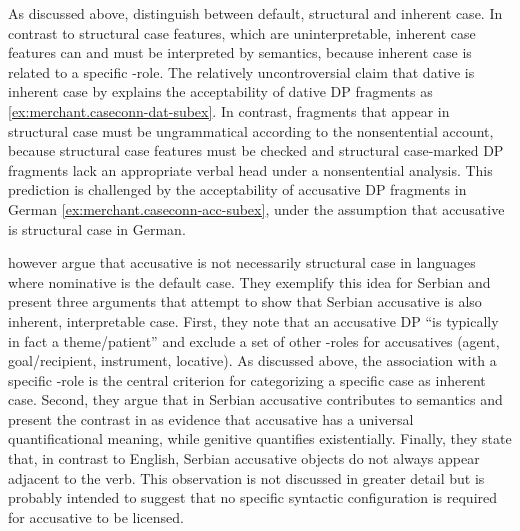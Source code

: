 As discussed above, \citet{progovac.etal2006} distinguish between default, structural and inherent case. In contrast to structural case features, which are uninterpretable, inherent case features can and must be interpreted by semantics, because inherent case is related to a specific \texttheta-role. The relatively uncontroversial claim that dative is inherent case by \citet[339]{progovac.etal2006} explains the acceptability of dative DP fragments as \ref{ex:merchant.caseconn-dat-subex}. In contrast, fragments that appear in structural case must be ungrammatical according to the nonsentential account, because structural case features must be checked and structural case-marked DP fragments lack an appropriate verbal head under a nonsentential analysis. This prediction is challenged by the acceptability of accusative DP fragments in German \ref{ex:merchant.caseconn-acc-subex}, under the assumption that accusative is structural case in German.

\newpage
\noindent \citet{progovac.etal2006} however argue that accusative is not necessarily structural case in languages where nominative is the default case. They exemplify this idea for Serbian and present three arguments that attempt to show that Serbian accusative is also inherent, interpretable case. First, they note that an accusative DP ``is typically in fact a theme/patient'' \citep[339]{progovac.etal2006} and exclude a set of other \texttheta-roles for accusatives (agent, goal/recipient, instrument, locative). As discussed above, the association with a specific \texttheta-role is the central criterion for categorizing a specific case as inherent case. Second, they argue that in Serbian accusative contributes to semantics and present the contrast in \Next as evidence that accusative has a universal quantificational meaning, while genitive quantifies existentially. Finally, they state that, in contrast to English, Serbian accusative objects do not always appear adjacent to the verb. This observation is not discussed in greater detail but is probably intended to suggest that no specific syntactic configuration is required for accusative to be licensed.


